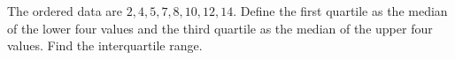 The ordered data are $2,4,5,7,8,10,12,14$. Define the first quartile as the median of the lower four values and the third quartile as the median of the upper four values. Find the interquartile range.
